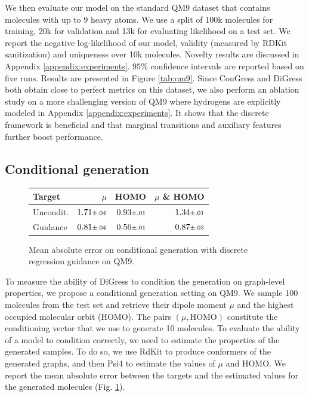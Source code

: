 \documentclass{article} %
\theoremstyle{plain}
\theoremstyle{definition}
\theoremstyle{remark}
\begin{document}
We then evaluate our model on the standard QM9 dataset \citep{wu2018moleculenet} that contains molecules with up to 9 heavy atoms. We use a split of 100k molecules for training, 20k for validation and 13k for evaluating likelihood on a test set. 
We report the negative log-likelihood of our model, validity (measured by RDKit sanitization) and uniqueness over 10k molecules. Novelty results are discussed in Appendix \ref{appendix:experiments}. $95\%$ confidence intervals are reported based on five runs.
Results are presented in Figure \ref{tab:qm9}. Since ConGress and DiGress both obtain close to perfect metrics on this dataset, we also perform an ablation study on a more challenging version of QM9 where hydrogens are explicitly modeled in Appendix \ref{appendix:experiments}. It shows that the discrete framework is beneficial and that marginal transitions and auxiliary features further boost performance.

\subsection{Conditional generation}
 
  \begin{figure}
  \vspace{-0.7cm}
        \caption{Mean absolute error on conditional generation with discrete regression guidance on QM9.\vspace{-0.1cm}}
    \begin{tabular}{l r r r} \toprule
    Target&  $\mu$ & HOMO &  $\mu$ \& HOMO\\\midrule
    Uncondit. & $1.71{\scriptstyle \pm {.04}}$  & $0.93{\scriptstyle \pm {.01}}$ & $1.34{\scriptstyle \pm {.01}}$  \\
    Guidance & $0.81{\scriptstyle \pm {.04}}$ & $0.56{\scriptstyle \pm {.01}}$ & $0.87{\scriptstyle \pm {.03}}$\\
    \bottomrule
    \end{tabular}
    \label{tab:qm9conditional}
 \end{figure}
To measure the ability of DiGress to condition the generation on graph-level properties, we propose a conditional generation setting on QM9. We sample 100 molecules from the test set and retrieve their dipole moment $\mu$ and the highest occupied molecular orbit (HOMO). The pairs $(\mu, \text{HOMO})$ constitute the conditioning vector that we use to generate 10 molecules. To evaluate the ability of a model to condition correctly, we need to estimate the properties of the generated samples. To do so, we use RdKit \citep{landrum2006rdkit} to produce conformers of the generated graphs, and then Psi4 \citep{smith2020psi4} to estimate the values of $\mu$ and HOMO. We report the mean absolute error between the targets and the estimated values for the generated molecules (Fig. \ref{tab:qm9conditional}). 
 
\end{document}
